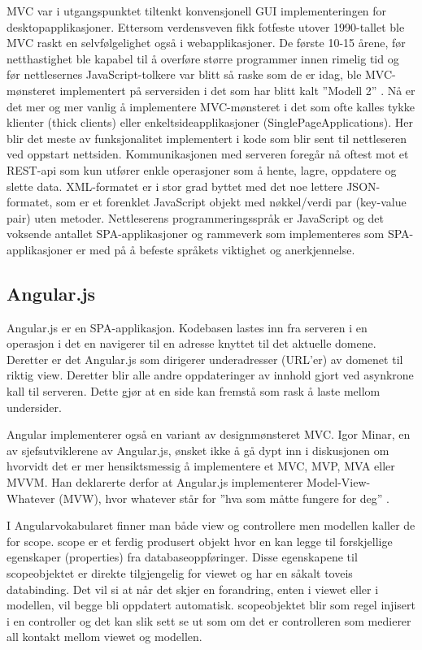 \documentclass[norsk]{article}
\begin{document}
MVC var i utgangspunktet tiltenkt konvensjonell GUI implementeringen for desktopapplikasjoner. Ettersom verdensveven fikk fotfeste utover 1990-tallet ble MVC raskt en selvfølgelighet også i webapplikasjoner. De første 10-15 årene, før netthastighet ble kapabel til å overføre større programmer innen rimelig tid og før nettlesernes JavaScript-tolkere var blitt så raske som de er idag, ble MVC-mønsteret implementert på serversiden i det som har blitt kalt ”Modell 2” \parencite[s. 557]{freeman}. Nå er det mer og mer vanlig å implementere MVC-mønsteret i det som ofte kalles tykke klienter (thick clients) eller enkeltsideapplikasjoner (SinglePageApplications). Her blir det meste av funksjonalitet implementert i kode som blir sent til nettleseren ved oppstart nettsiden. Kommunikasjonen med serveren foregår nå oftest mot et REST-api som kun utfører enkle operasjoner som å hente, lagre, oppdatere og slette data. XML-formatet er i stor grad byttet med det noe lettere JSON-formatet, som er et forenklet JavaScript objekt med nøkkel/verdi par (key-value pair) uten metoder. Nettleserens programmeringsspråk er JavaScript og det voksende antallet SPA-applikasjoner og rammeverk som implementeres som SPA-applikasjoner er med på å befeste språkets viktighet og anerkjennelse. 

\subsection{Angular.js}
Angular.js er en SPA-applikasjon. Kodebasen lastes inn fra serveren i
en operasjon i det en navigerer til en adresse knyttet til det
aktuelle domene. Deretter er det Angular.js som dirigerer
underadresser (URL’er) av domenet til riktig view. Deretter blir alle
andre oppdateringer av innhold gjort ved asynkrone kall til
serveren. Dette gjør at en side kan fremstå som rask å laste mellom
undersider.

Angular implementerer også en variant av designmønsteret MVC. Igor
Minar, en av sjefsutviklerene av Angular.js, ønsket ikke å gå dypt inn
i diskusjonen om hvorvidt det er mer hensiktsmessig å implementere et
MVC, MVP, MVA eller MVVM. Han deklarerte derfor at Angular.js
implementerer Model-View-Whatever (MVW), hvor whatever står for ”hva
som måtte fungere for deg” \parencite{angularMVW}. 

I Angularvokabularet finner man både view og controllere men modellen
kaller de for scope. scope er et ferdig produsert objekt hvor en kan
legge til forskjellige egenskaper (properties) fra
databaseoppføringer. Disse egenskapene til scopeobjektet er direkte
tilgjengelig for viewet og har en såkalt toveis databinding. Det vil
si at når det skjer en forandring, enten i viewet eller i modellen,
vil begge bli oppdatert automatisk. scopeobjektet blir som regel
injisert i en controller og det kan slik sett se ut som om det er
controlleren som medierer all kontakt mellom viewet og modellen. 
\end{document}
